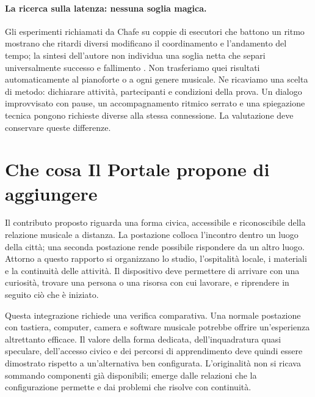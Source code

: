 \paragraph{La ricerca sulla latenza: nessuna soglia magica.}
Gli esperimenti richiamati da Chafe su coppie di esecutori che battono un ritmo mostrano che ritardi diversi modificano il coordinamento e l'andamento del tempo; la sintesi dell'autore non individua una soglia netta che separi universalmente successo e fallimento \cite{teleconc_chafe}. Non trasferiamo quei risultati automaticamente al pianoforte o a ogni genere musicale. Ne ricaviamo una scelta di metodo: dichiarare attività, partecipanti e condizioni della prova. Un dialogo improvvisato con pause, un accompagnamento ritmico serrato e una spiegazione tecnica pongono richieste diverse alla stessa connessione. La valutazione deve conservare queste differenze.

\section{Che cosa Il Portale propone di aggiungere}

Il contributo proposto riguarda una forma civica, accessibile e riconoscibile della relazione musicale a distanza. La postazione colloca l'incontro dentro un luogo della città; una seconda postazione rende possibile rispondere da un altro luogo. Attorno a questo rapporto si organizzano lo studio, l'ospitalità locale, i materiali e la continuità delle attività. Il dispositivo deve permettere di arrivare con una curiosità, trovare una persona o una risorsa con cui lavorare, e riprendere in seguito ciò che è iniziato.

Questa integrazione richiede una verifica comparativa. Una normale postazione con tastiera, computer, camera e software musicale potrebbe offrire un'esperienza altrettanto efficace. Il valore della forma dedicata, dell'inquadratura quasi speculare, dell'accesso civico e dei percorsi di apprendimento deve quindi essere dimostrato rispetto a un'alternativa ben configurata. L'originalità non si ricava sommando componenti già disponibili; emerge dalle relazioni che la configurazione permette e dai problemi che risolve con continuità.

